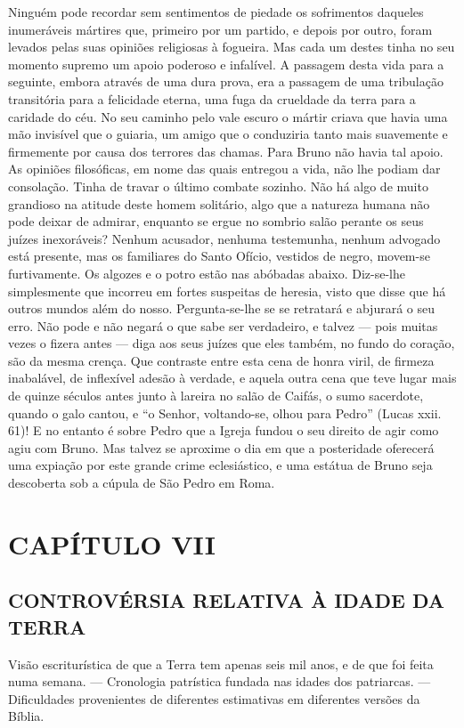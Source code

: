 \documentclass[11pt,a5paper,twoside,openany]{book}
\begin{document}
Ninguém pode recordar sem sentimentos de piedade os sofrimentos daqueles inumeráveis mártires que, primeiro por um partido, e depois por outro, foram levados pelas suas opiniões religiosas à fogueira. Mas cada um destes tinha no seu momento supremo um apoio poderoso e infalível. A passagem desta vida para a seguinte, embora através de uma dura prova, era a passagem de uma tribulação transitória para a felicidade eterna, uma fuga da crueldade da terra para a caridade do céu. No seu caminho pelo vale escuro o mártir criava que havia uma mão invisível que o guiaria, um amigo que o conduziria tanto mais suavemente e firmemente por causa dos terrores das chamas. Para Bruno não havia tal apoio. As opiniões filosóficas, em nome das quais entregou a vida, não lhe podiam dar consolação. Tinha de travar o último combate sozinho. Não há algo de muito grandioso na atitude deste homem solitário, algo que a natureza humana não pode deixar de admirar, enquanto se ergue no sombrio salão perante os seus juízes inexoráveis? Nenhum acusador, nenhuma testemunha, nenhum advogado está presente, mas os familiares do Santo Ofício, vestidos de negro, movem-se furtivamente. Os algozes e o potro estão nas abóbadas abaixo. Diz-se-lhe simplesmente que incorreu em fortes suspeitas de heresia, visto que disse que há outros mundos além do nosso. Pergunta-se-lhe se se retratará e abjurará o seu erro. Não pode e não negará o que sabe ser verdadeiro, e talvez — pois muitas vezes o fizera antes — diga aos seus juízes que eles também, no fundo do coração, são da mesma crença. Que contraste entre esta cena de honra viril, de firmeza inabalável, de inflexível adesão à verdade, e aquela outra cena que teve lugar mais de quinze séculos antes junto à lareira no salão de Caifás, o sumo sacerdote, quando o galo cantou, e “o Senhor, voltando-se, olhou para Pedro” (Lucas xxii. 61)! E no entanto é sobre Pedro que a Igreja fundou o seu direito de agir como agiu com Bruno. Mas talvez se aproxime o dia em que a posteridade oferecerá uma expiação por este grande crime eclesiástico, e uma estátua de Bruno seja descoberta sob a cúpula de São Pedro em Roma.

\clearpage
\chapter*{CAPÍTULO VII}
\section*{CONTROVÉRSIA RELATIVA À IDADE DA TERRA}
Visão escriturística de que a Terra tem apenas seis mil anos, e de que foi feita numa semana. — Cronologia patrística fundada nas idades dos patriarcas. — Dificuldades provenientes de diferentes estimativas em diferentes versões da Bíblia.
\end{document}

